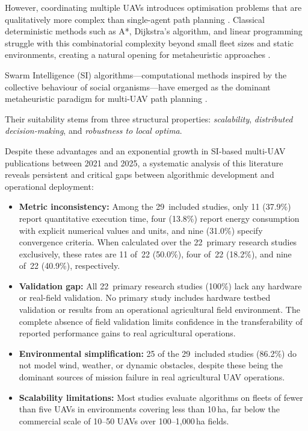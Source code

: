 \documentclass[review,3p]{elsarticle}
\begin{document}
However, coordinating multiple UAVs introduces optimisation problems that are
qualitatively more complex than single-agent path planning
\cite{chung2018,gupta2016,bekmezci2013,hayat2016}. Classical deterministic
methods such as A*, Dijkstra's algorithm, and linear programming struggle with
this combinatorial complexity beyond small fleet sizes and static environments,
creating a natural opening for metaheuristic approaches \cite{aitsaadi2022}.

{\sloppy Swarm Intelligence (SI) algorithms---computational methods inspired by the
collective behaviour of social organisms---have emerged as the dominant
metaheuristic paradigm for multi-UAV path planning
\cite{dorigo2006,kennedy1995,blum2008} \cite{yang2010,beni2005,bonabeau1999,yang2013}.\par}
Their suitability stems from three structural properties: \textit{scalability},
\textit{distributed decision-making}, and \textit{robustness to local optima}.

Despite these advantages and an exponential growth in SI-based multi-UAV
publications between 2021 and 2025, a systematic analysis of this literature
reveals persistent and critical gaps between algorithmic development and
operational deployment:

\begin{itemize}
  \item \textbf{Metric inconsistency:} Among the 29~included studies,
  only 11 (37.9\%) report quantitative execution time, four (13.8\%) report
  energy consumption with explicit numerical values and units, and nine (31.0\%)
  specify convergence criteria. When calculated over the 22~primary research
  studies exclusively, these rates are 11 of~22 (50.0\%), four of~22 (18.2\%),
  and nine of~22 (40.9\%), respectively.

  \item \textbf{Validation gap:} All 22~primary research studies (100\%)
  lack any hardware or real-field validation. No primary study includes hardware
  testbed validation or results from an operational agricultural field
  environment. The complete absence of field validation limits confidence in
  the transferability of reported performance gains to real agricultural
  operations.

  \item \textbf{Environmental simplification:} 25 of the 29~included studies
  (86.2\%) do not model wind, weather, or dynamic obstacles, despite these being
  the dominant sources of mission failure in real agricultural UAV operations.

  \item \textbf{Scalability limitations:} Most studies evaluate algorithms on
  fleets of fewer than five UAVs in environments covering less than 10\,ha,
  far below the commercial scale of 10--50 UAVs over 100--1,000\,ha fields.
\end{itemize}
\end{document}
